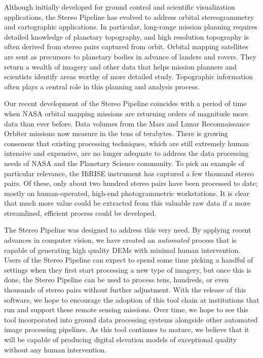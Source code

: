 Although initially developed for ground control and scientific
visualization applications, the Stereo Pipeline has evolved
 to address orbital stereogrammetry and cartographic
applications.  In particular, long-range mission planning requires
detailed knowledge of planetary topography, and high resolution
topography is often derived from stereo pairs captured from orbit.
Orbital mapping satellites are sent as precursors to planetary bodies
in advance of landers and rovers.  They return a wealth of imagery and
other data that helps mission planners and scientists identify areas
worthy of more detailed study. Topographic information often plays a
central role in this planning and analysis process.

Our recent development of the Stereo Pipeline coincides with a
period of time when \ac{NASA} orbital mapping missions are returning
orders of magnitude more data than ever before.  Data volumes from
the Mars and Lunar Reconnaissance Orbiter missions now measure in
the tens of terabytes.  There is growing consensus that existing
processing techniques, which are still extremely human intensive
and expensive, are no longer adequate to address the data processing
needs of \ac{NASA} and the Planetary Science community.  To pick
an example of particular relevance, the \ac{HiRISE} instrument has
captured a few thousand stereo pairs.
Of these, only about two hundred stereo pairs have been processed to
date; mostly on human-operated, high-end photogrammetric workstations.
It is clear that much more value could be extracted from this
valuable raw data if a more streamlined, efficient process could be
developed.

The Stereo Pipeline was designed to address this very need.  By
applying recent advances in computer vision, we have
created an {\em automated} process that is capable of generating high
quality \acp{DEM} with minimal human intervention.  Users of the Stereo
Pipeline can expect to spend some time picking a handful of settings
when they first start processing a new type of imagery, but once this
is done, the Stereo Pipeline can be used to process tens, hundreds, or
even thousands of stereo pairs without further adjustment.  With the
release of this software, we hope to encourage the adoption of this
tool chain at institutions that run and support these remote sensing
missions.  Over time, we hope to see this tool incorporated into
ground data processing systems alongside other automated image
processing pipelines.  As this tool continues to mature, we believe
that it will be capable of producing digital elevation models of
exceptional quality without any human intervention.

